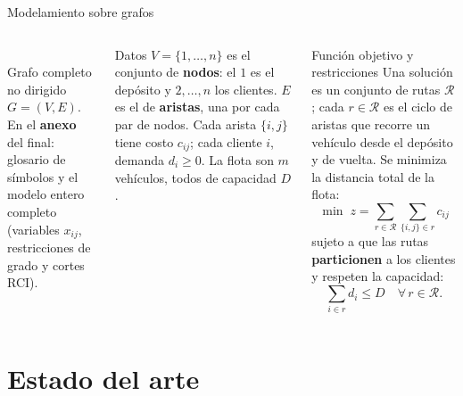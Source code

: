 \documentclass[aspectratio=169, 11pt, xcolor={dvipsnames,table}]{beamer}
\newcommand{\azul}[1]{\textcolor{UsachAzul}{#1}}
\newcommand{\gris}[1]{\textcolor{UsachGris}{#1}}
\begin{document}
\begin{frame}{Modelamiento sobre grafos}
\begin{columns}[c]
\centering
{}\\[6pt]
{\scriptsize Grafo completo no dirigido $G=(V,E)$.}\\[8pt]
{\tiny \gris{En el \textbf{anexo} del final: glosario de símbolos y el modelo entero
completo (variables $x_{ij}$, restricciones de grado y cortes RCI).}}
\begin{block}{Datos}
\scriptsize
\azul{$V=\{1,\dots,n\}$} es el conjunto de \textbf{nodos}: el $1$ es el depósito y
$2,\dots,n$ los clientes. \azul{$E$} es el de \textbf{aristas}, una por cada par de nodos.
Cada arista $\{i,j\}$ tiene costo $c_{ij}$; cada cliente $i$, demanda $d_i\ge 0$. La flota
son $m$ vehículos, todos de capacidad $D$.
\end{block}
\begin{alertblock}{Función objetivo y restricciones}
\scriptsize
Una solución es un conjunto de rutas $\mathcal{R}$; \azul{cada $r \in \mathcal{R}$ es el ciclo
de aristas que recorre un vehículo} desde el depósito y de vuelta. Se minimiza la distancia
total de la flota:
\[ \min \; z = \sum_{r \in \mathcal{R}} \sum_{\{i,j\} \in r} c_{ij} \]
sujeto a que las rutas \textbf{particionen} a los clientes y respeten la capacidad:
\[ \sum_{i \in r} d_i \le D \quad \forall\, r \in \mathcal{R}. \]
\end{alertblock}
\end{columns}
\end{frame}

\section{Estado del arte}
\end{document}
